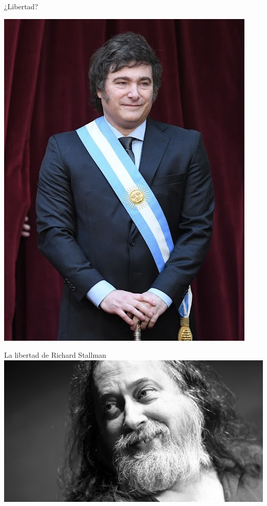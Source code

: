 \documentclass{beamer}
\begin{document}
\begin{frame}{¿Libertad?}
\begin{minipage}{0.45\textwidth}
        \includegraphics[width=\linewidth]{images/milei.jpg}
    \end{minipage}
\end{frame}


\begin{frame}{La libertad de Richard Stallman}
  \includegraphics[width=\linewidth]{images/stallman.png}
\end{frame}
\end{document}

